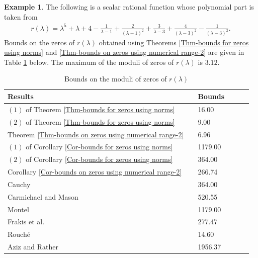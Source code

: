 \documentclass[12pt, reqno]{amsart}
\theoremstyle{definition}
\newtheorem{example}[theorem]{Example}
\theoremstyle{remark}
\numberwithin{equation}{section}
\begin{document}
\begin{example}\label{example-4.2}
The following is a scalar rational function whose polynomial part 
is taken from \cite{Abdelkader-Faud-Soumia}
\begin{align*}
r(\lambda) = \lambda^5 + \lambda +4- \displaystyle \frac{1}{\lambda -1}+ 
\frac{2}{(\lambda -1)^2}+\frac{3}{\lambda -3}+\frac{4}{(\lambda -3)^2}-
\frac{1}{(\lambda -3)^2}.
\end{align*}
Bounds on the zeros of $r(\lambda)$ obtained using Theorems 
\ref{Thm-bounds for zeros using norms} and 
\ref{Thm-bounds on zeros using numerical range-2} are given in Table \ref{table:3} 
below. The maximum of the moduli of zeros of $r(\lambda)$ is $3.12$.

\begin{table}[h!]
\centering
\begin{tabular}{l l l l l l}
\hline
Results & \hspace{5cm} & Bounds \\ [0.5ex] 
\hline

$(1)$ of Theorem \ref{Thm-bounds for zeros using norms} & \hspace{5cm} & 16.00\\
$(2)$ of Theorem \ref{Thm-bounds for zeros using norms}  & \hspace{5cm} & 9.00\\
Theorem \ref{Thm-bounds on zeros using numerical range-2} & \hspace{5cm} & 6.96\\
$(1)$ of Corollary \ref{Cor-bounds for zeros using norms} & \hspace{5cm} & 1179.00\\
$(2)$ of Corollary \ref{Cor-bounds for zeros using norms} & \hspace{5cm} & 364.00\\
Corollary \ref{Cor-bounds on zeros using numerical range-2} & \hspace{5cm} & 266.74\\
Cauchy \cite{Horn-Johnson} & \hspace{5cm} & 364.00\\
Carmichael and Mason \cite{Horn-Johnson} & \hspace{5cm} & 520.55\\
Montel \cite{Horn-Johnson} & \hspace{5cm} & 1179.00\\
Frakis et al. \cite{Abdelkader-Faud-Soumia} & \hspace{5cm} & 277.47\\
Rouch\'e \cite{Cauchy} & \hspace{5cm} & 14.60\\
Aziz and Rather \cite{Aziz-Rather} & \hspace{5cm} & 1956.37\\[1ex] 
\hline
\end{tabular}
\vspace{0.2cm}
\caption{Bounds on the moduli of zeros of $r(\lambda)$}
\label{table:3}
\end{table} 


\end{example}
\end{document}
